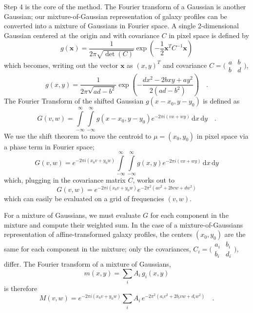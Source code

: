 \documentclass[11pt,preprint]{aastex}
\newcommand{\trick}{method}
\begin{document}
Step 4 is the core of the \trick.  The Fourier transform of
a Gaussian is another Gaussian; our mixture-of-Gaussian representation
of galaxy profiles can be converted into a mixture of Gaussians in
Fourier space.
%
A single 2-dimensional Gaussian
centered at the origin and
with covariance $C$
in pixel space is defined by
\begin{equation}
g(\bm{x}) = \frac{1}{2 \pi \sqrt{\det(C)}}
\exp\left( -\frac{1}{2} \bm{x}^T C^{-1} \bm{x} \right)
\end{equation}
which becomes, writing out the vector $\bm{x}$ as $(x,y)^T$
and covariance $C = \bigl(\begin{smallmatrix}
a&b \\ b&d
\end{smallmatrix} \bigr)$,
\begin{equation}
g(x, y) = \frac{1}{2 \pi \sqrt{a d - b^2}}
\exp \left(
-\frac{d x^2 - 2 b x y + a y^2}{2(a d - b^2)}
\right) \quad .
\end{equation}
%
The Fourier Transform of the shifted Gaussian $g(x - x_0, y - y_0)$ is defined as
\begin{equation}
G(v,w) =
\int\limits_{-\infty}^{\infty}
\int\limits_{-\infty}^{\infty}
g(x - x_0, y - y_0) e^{-2 \pi i (v x + w y)} \, \mathrm{d}x \, \mathrm{d}y
\quad .
\end{equation}
We use the shift theorem to move the centroid to $\mu = (x_0, y_0)$
in pixel space via a phase term in Fourier space;
\begin{equation}
G(v, w) =
e^{-2 \pi i (x_0 v + y_0 w)}
\int\limits_{-\infty}^{\infty}
\int\limits_{-\infty}^{\infty}
g(x, y) e^{-2 \pi i (v x + w y)} \, \mathrm{d}x \, \mathrm{d}y
\end{equation}
%
which, plugging in the covariance matrix $C$, works out to
\begin{equation}
G(v,w) =
e^{-2 \pi i (x_0 v + y_0 w)}
e^{-2 \pi^2 (a v^2 + 2 b v w + d w^2)}
\end{equation}
which can easily be evaluated on a grid of frequencies $(v, w)$.

For a mixture of Gaussians, we must evaluate $G$ for each component in
the mixture and compute their weighted sum.  In the case of a
mixture-of-Gaussians representation of affine-transformed galaxy
profiles, the centers $(x_0, y_0)$ are the same for each component in
the mixture; only the covariances,
$C_i = \bigl(\begin{smallmatrix}
a_i&b_i \\ b_i&d_i
\end{smallmatrix} \bigr)$,
differ.  The Fourier transform
of a mixture of Gaussians,
\begin{equation}
m(x,y) = \sum_i A_i \, g_i(x, y)
\end{equation}
is therefore
\begin{equation}
M(v, w) = e^{-2 \pi i (x_0 v + y_0 w)}
\sum_i A_i \,
e^{-2 \pi^2 (a_i v^2 + 2 b_i v w + d_i w^2)}
\quad .
\end{equation}
\end{document}
